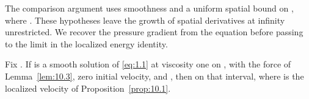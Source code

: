 The comparison argument uses smoothness and a uniform spatial
 bound on , where
. These hypotheses leave the growth of spatial derivatives at
infinity unrestricted. We recover the pressure gradient from the equation before passing to
the limit in the localized energy identity.

\begin{lemma}\label{lem:10.5}
Fix . If  is a smooth solution of
\eqref{eq:1.1} at viscosity one on , with the force
 of Lemma~\ref{lem:10.3}, zero initial velocity, and
, then
 on that interval, where  is the
localized velocity of Proposition~\ref{prop:10.1}.
\end{lemma}

